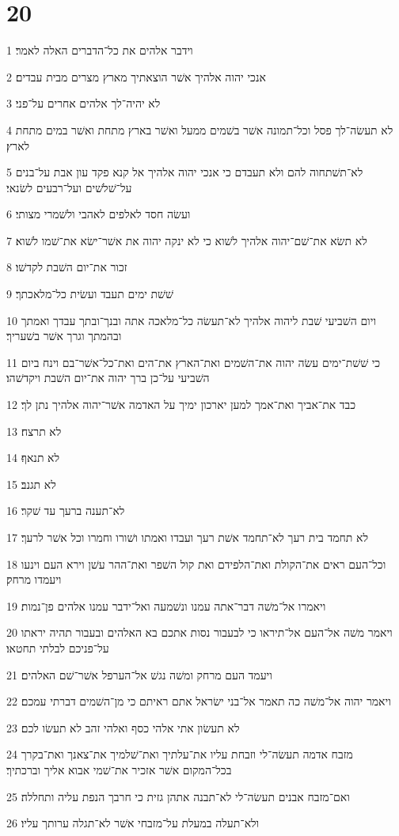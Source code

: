 \chapter{20}

\par 1 וידבר אלהים את כל־הדברים האלה לאמר׃
\par 2 אנכי יהוה אלהיך אשׁר הוצאתיך מארץ מצרים מבית עבדים׃
\par 3 לא יהיה־לך אלהים אחרים על־פני׃
\par 4 לא תעשׂה־לך פסל וכל־תמונה אשׁר בשׁמים ממעל ואשׁר בארץ מתחת ואשׁר במים מתחת לארץ׃
\par 5 לא־תשׁתחוה להם ולא תעבדם כי אנכי יהוה אלהיך אל קנא פקד עון אבת על־בנים על־שׁלשׁים ועל־רבעים לשׂנאי׃
\par 6 ועשׂה חסד לאלפים לאהבי ולשׁמרי מצותי׃
\par 7 לא תשׂא את־שׁם־יהוה אלהיך לשׁוא כי לא ינקה יהוה את אשׁר־ישׂא את־שׁמו לשׁוא׃
\par 8 זכור את־יום השׁבת לקדשׁו׃
\par 9 שׁשׁת ימים תעבד ועשׂית כל־מלאכתך׃
\par 10 ויום השׁביעי שׁבת ליהוה אלהיך לא־תעשׂה כל־מלאכה אתה ובנך־ובתך עבדך ואמתך ובהמתך וגרך אשׁר בשׁעריך׃
\par 11 כי שׁשׁת־ימים עשׂה יהוה את־השׁמים ואת־הארץ את־הים ואת־כל־אשׁר־בם וינח ביום השׁביעי על־כן ברך יהוה את־יום השׁבת ויקדשׁהו׃
\par 12 כבד את־אביך ואת־אמך למען יארכון ימיך על האדמה אשׁר־יהוה אלהיך נתן לך׃
\par 13 לא תרצח׃
\par 14 לא תנאף׃
\par 15 לא תגנב׃
\par 16 לא־תענה ברעך עד שׁקר׃
\par 17 לא תחמד בית רעך לא־תחמד אשׁת רעך ועבדו ואמתו ושׁורו וחמרו וכל אשׁר לרעך׃
\par 18 וכל־העם ראים את־הקולת ואת־הלפידם ואת קול השׁפר ואת־ההר עשׁן וירא העם וינעו ויעמדו מרחק׃
\par 19 ויאמרו אל־משׁה דבר־אתה עמנו ונשׁמעה ואל־ידבר עמנו אלהים פן־נמות׃
\par 20 ויאמר משׁה אל־העם אל־תיראו כי לבעבור נסות אתכם בא האלהים ובעבור תהיה יראתו על־פניכם לבלתי תחטאו׃
\par 21 ויעמד העם מרחק ומשׁה נגשׁ אל־הערפל אשׁר־שׁם האלהים׃
\par 22 ויאמר יהוה אל־משׁה כה תאמר אל־בני ישׂראל אתם ראיתם כי מן־השׁמים דברתי עמכם׃
\par 23 לא תעשׂון אתי אלהי כסף ואלהי זהב לא תעשׂו לכם׃
\par 24 מזבח אדמה תעשׂה־לי וזבחת עליו את־עלתיך ואת־שׁלמיך את־צאנך ואת־בקרך בכל־המקום אשׁר אזכיר את־שׁמי אבוא אליך וברכתיך׃
\par 25 ואם־מזבח אבנים תעשׂה־לי לא־תבנה אתהן גזית כי חרבך הנפת עליה ותחללה׃
\par 26 ולא־תעלה במעלת על־מזבחי אשׁר לא־תגלה ערותך עליו׃

